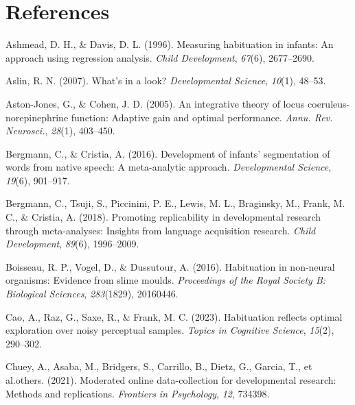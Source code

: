 \documentclass[10pt, letterpaper]{article}
\newenvironment{CSLReferences}%
  {}%
  {\par}
\begin{document}
\hypertarget{references}{%
\section{References}\label{references}}

\setlength{\parindent}{-0.1in} 
\setlength{\leftskip}{0.125in}

\noindent

\hypertarget{refs}{}
\begin{CSLReferences}{1}{0}
\leavevmode{}%
Ashmead, D. H., \& Davis, D. L. (1996). Measuring habituation in
infants: An approach using regression analysis. \emph{Child
Development}, \emph{67}(6), 2677--2690.

\leavevmode{}%
Aslin, R. N. (2007). What's in a look? \emph{Developmental Science},
\emph{10}(1), 48--53.

\leavevmode{}%
Aston-Jones, G., \& Cohen, J. D. (2005). An integrative theory of locus
coeruleus-norepinephrine function: Adaptive gain and optimal
performance. \emph{Annu. Rev. Neurosci.}, \emph{28}(1), 403--450.

\leavevmode{}%
Bergmann, C., \& Cristia, A. (2016). Development of infants'
segmentation of words from native speech: A meta-analytic approach.
\emph{Developmental Science}, \emph{19}(6), 901--917.

\leavevmode{}%
Bergmann, C., Tsuji, S., Piccinini, P. E., Lewis, M. L., Braginsky, M.,
Frank, M. C., \& Cristia, A. (2018). Promoting replicability in
developmental research through meta-analyses: Insights from language
acquisition research. \emph{Child Development}, \emph{89}(6),
1996--2009.

\leavevmode{}%
Boisseau, R. P., Vogel, D., \& Dussutour, A. (2016). Habituation in
non-neural organisms: Evidence from slime moulds. \emph{Proceedings of
the Royal Society B: Biological Sciences}, \emph{283}(1829), 20160446.

\leavevmode{}%
Cao, A., Raz, G., Saxe, R., \& Frank, M. C. (2023). Habituation reflects
optimal exploration over noisy perceptual samples. \emph{Topics in
Cognitive Science}, \emph{15}(2), 290--302.

\leavevmode{}%
Chuey, A., Asaba, M., Bridgers, S., Carrillo, B., Dietz, G., Garcia, T.,
et al.others. (2021). Moderated online data-collection for developmental
research: Methods and replications. \emph{Frontiers in Psychology},
\emph{12}, 734398.


\end{CSLReferences}
\end{document}
